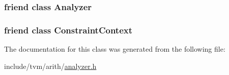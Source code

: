 \subsubsection[{\texorpdfstring{Analyzer}{Analyzer}}]{\setlength{\rightskip}{0pt plus 5cm}friend class {\bf Analyzer}\hspace{0.3cm}{\ttfamily [friend]}}\hypertarget{classtvm_1_1arith_1_1ConstIntBoundAnalyzer_a88d594816df596eed10643082b0d0805}{}\label{classtvm_1_1arith_1_1ConstIntBoundAnalyzer_a88d594816df596eed10643082b0d0805}
\subsubsection[{\texorpdfstring{Constraint\+Context}{ConstraintContext}}]{\setlength{\rightskip}{0pt plus 5cm}friend class {\bf Constraint\+Context}\hspace{0.3cm}{\ttfamily [friend]}}\hypertarget{classtvm_1_1arith_1_1ConstIntBoundAnalyzer_ab8bf22547cf1df0a28fc4ee98841ab89}{}\label{classtvm_1_1arith_1_1ConstIntBoundAnalyzer_ab8bf22547cf1df0a28fc4ee98841ab89}


The documentation for this class was generated from the following file\+:\begin{DoxyCompactItemize}
\item 
include/tvm/arith/\hyperlink{analyzer_8h}{analyzer.\+h}\end{DoxyCompactItemize}
